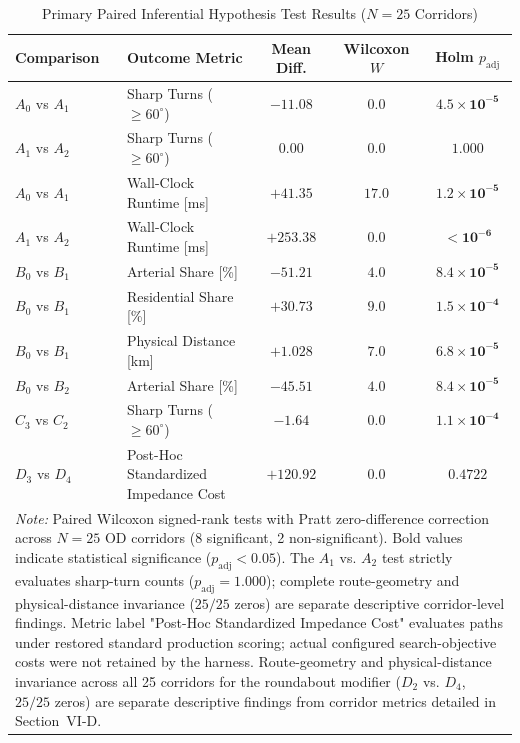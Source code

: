 \documentclass[conference]{IEEEtran}
\begin{document}
\begin{table}[t]
\caption{Primary Paired Inferential Hypothesis Test Results ($N=25$ Corridors)}
\label{tab:statistical_results}
\centering
\footnotesize
\setlength{\tabcolsep}{2.2pt}
\begin{tabular}{llccc}
\hline
\textbf{Comparison} & \textbf{Outcome Metric} & \textbf{Mean Diff.} & \textbf{Wilcoxon $W$} & \textbf{Holm $p_{\mathrm{adj}}$} \\
\hline
$A_0$ vs $A_1$ & Sharp Turns ($\ge 60^\circ$) & $-11.08$ & $0.0$ & $\mathbf{4.5 \times 10^{-5}}$ \\
$A_1$ vs $A_2$ & Sharp Turns ($\ge 60^\circ$) & $0.00$ & $0.0$ & $1.000$ \\
$A_0$ vs $A_1$ & Wall-Clock Runtime [ms] & $+41.35$ & $17.0$ & $\mathbf{1.2 \times 10^{-5}}$ \\
$A_1$ vs $A_2$ & Wall-Clock Runtime [ms] & $+253.38$ & $0.0$ & $\mathbf{< 10^{-6}}$ \\
$B_0$ vs $B_1$ & Arterial Share [\%] & $-51.21$ & $4.0$ & $\mathbf{8.4 \times 10^{-5}}$ \\
$B_0$ vs $B_1$ & Residential Share [\%] & $+30.73$ & $9.0$ & $\mathbf{1.5 \times 10^{-4}}$ \\
$B_0$ vs $B_1$ & Physical Distance [km] & $+1.028$ & $7.0$ & $\mathbf{6.8 \times 10^{-5}}$ \\
$B_0$ vs $B_2$ & Arterial Share [\%] & $-45.51$ & $4.0$ & $\mathbf{8.4 \times 10^{-5}}$ \\
$C_3$ vs $C_2$ & Sharp Turns ($\ge 60^\circ$) & $-1.64$ & $0.0$ & $\mathbf{1.1 \times 10^{-4}}$ \\
$D_3$ vs $D_4$ & Post-Hoc Standardized Impedance Cost & $+120.92$ & $0.0$ & $0.4722$ \\
\hline
\multicolumn{5}{p{3.3in}}{\scriptsize \textit{Note:} Paired Wilcoxon signed-rank tests with Pratt zero-difference correction across $N=25$ OD corridors (8 significant, 2 non-significant). Bold values indicate statistical significance ($p_{\mathrm{adj}} < 0.05$). The $A_1$ vs. $A_2$ test strictly evaluates sharp-turn counts ($p_{\mathrm{adj}} = 1.000$); complete route-geometry and physical-distance invariance ($25/25$ zeros) are separate descriptive corridor-level findings. Metric label "Post-Hoc Standardized Impedance Cost" evaluates paths under restored standard production scoring; actual configured search-objective costs were not retained by the harness. Route-geometry and physical-distance invariance across all 25 corridors for the roundabout modifier ($D_2$ vs. $D_4$, $25/25$ zeros) are separate descriptive findings from corridor metrics detailed in Section~VI-D.}
\end{tabular}
\end{table}
\end{document}
